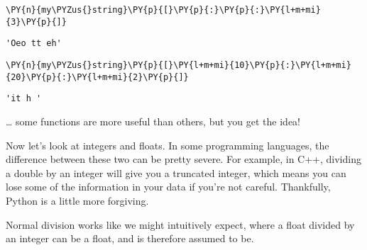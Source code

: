     \begin{tcolorbox}[breakable, size=fbox, boxrule=1pt, pad at break*=1mm,colback=cellbackground, colframe=cellborder]
\begin{Verbatim}[commandchars=\\\{\}]
\PY{n}{my\PYZus{}string}\PY{p}{[}\PY{p}{:}\PY{p}{:}\PY{l+m+mi}{3}\PY{p}{]}
\end{Verbatim}
\end{tcolorbox}

            \begin{tcolorbox}[breakable, size=fbox, boxrule=.5pt, pad at break*=1mm, opacityfill=0]
\begin{Verbatim}[commandchars=\\\{\}]
'Oeo tt eh'
\end{Verbatim}
\end{tcolorbox}
        
    \begin{tcolorbox}[breakable, size=fbox, boxrule=1pt, pad at break*=1mm,colback=cellbackground, colframe=cellborder]
\begin{Verbatim}[commandchars=\\\{\}]
\PY{n}{my\PYZus{}string}\PY{p}{[}\PY{l+m+mi}{10}\PY{p}{:}\PY{l+m+mi}{20}\PY{p}{:}\PY{l+m+mi}{2}\PY{p}{]}
\end{Verbatim}
\end{tcolorbox}

            \begin{tcolorbox}[breakable, size=fbox, boxrule=.5pt, pad at break*=1mm, opacityfill=0]
\begin{Verbatim}[commandchars=\\\{\}]
'it h '
\end{Verbatim}
\end{tcolorbox}
        
    \ldots{} some functions are more useful than others, but you get the
idea!

Now let's look at integers and floats. In some programming languages,
the difference between these two can be pretty severe. For example, in
C++, dividing a double by an integer will give you a truncated integer,
which means you can lose some of the information in your data if you're
not careful. Thankfully, Python is a little more forgiving.

Normal division works like we might intuitively expect, where a float
divided by an integer can be a float, and is therefore assumed to be.

